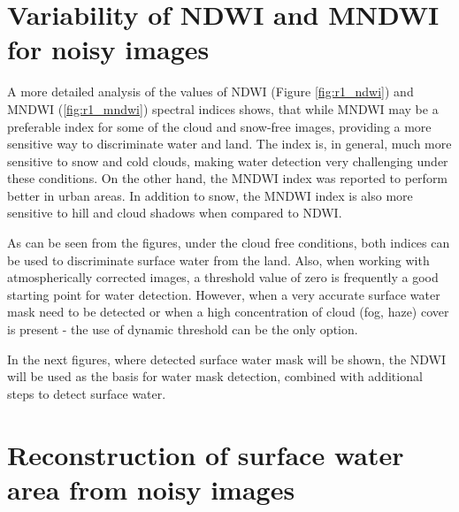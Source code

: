 \section{Variability of NDWI and MNDWI for noisy images}

A more detailed analysis of the values of NDWI (Figure \ref{fig:r1_ndwi}) and MNDWI (\ref{fig:r1_mndwi}) spectral indices shows, that while MNDWI may be a preferable index for some of the cloud and snow-free images, providing a more sensitive way to discriminate water and land. The index is, in general, much more sensitive to snow and cold clouds, making water detection very challenging under these conditions. On the other hand, the MNDWI index was reported to perform better in urban areas. In addition to snow, the MNDWI index is also more sensitive to hill and cloud shadows when compared to NDWI. 


As can be seen from the figures, under the cloud free conditions, both indices can be used to discriminate surface water from the land. Also, when working with atmospherically corrected images, a threshold value of zero is frequently a good starting point for water detection. However, when a very accurate surface water mask need to be detected or when a high concentration of cloud (fog, haze) cover is present - the use of dynamic threshold can be the only option.

In the next figures, where detected surface water mask will be shown, the NDWI will be used as the basis for water mask detection, combined with additional steps to detect surface water. 

\section{Reconstruction of surface water area from noisy images}

